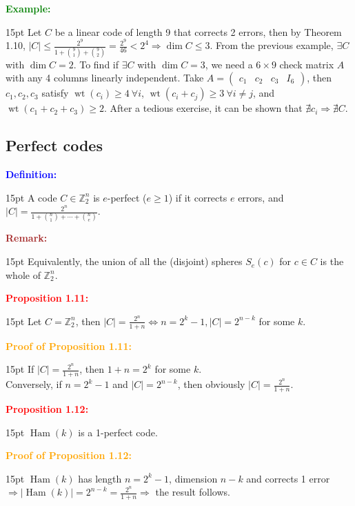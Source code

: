 \documentclass[12pt]{article}
\newcommand{\noparskip}{\vspace{-\parskip}}
\newenvironment{dent}
	{\begin{adjustwidth}{15pt}{}\noparskip}
	{\end{adjustwidth}}
\newenvironment{result}[1]
	{\textcolor{Red}{\textbf{#1:}}\begin{dent}}
	{\end{dent}}
\newenvironment{proof}[1]
	{\textcolor{Orange}{\textbf{Proof of #1:}}\begin{dent}}
	{\end{dent}}
\newenvironment{definition}
	{\textcolor{Blue}{\textbf{Definition:}}\begin{dent}}
	{\end{dent}}
\newenvironment{example}
	{\textcolor{Green}{\textbf{Example:}}\begin{dent}}
	{\end{dent}}
\newenvironment{remark}
	{\textcolor{Brown}{\textbf{Remark:}}\begin{dent}}
	{\end{dent}}
\renewcommand{\implies}{\Rightarrow}
\renewcommand{\iff}{\Leftrightarrow}
\newcommand{\sizeof}[1]{\left| #1 \right|}
\newcommand{\Z}{\mathbb{Z}}
\newcommand{\wt}[1]{\operatorname{wt}(#1)}
\newcommand{\Ham}[1]{\operatorname{Ham}(#1)}
\begin{document}
\begin{example}
Let $C$ be a linear code of length 9 that corrects 2 errors, then by Theorem 1.10, $\sizeof{C} \le \frac{2^9}{1 + \binom{9}{1} + \binom{9}{2}} = \frac{2^9}{46} < 2^4 \implies \dim C \le 3$. From the previous example, $\exists C$ with $\dim C = 2$. To find if $\exists C$ with $\dim C = 3$, we need a $6 \times 9$ check matrix $A$ with any 4 columns linearly independent. Take $A = \begin{pmatrix} c_1 & c_2 & c_3 & I_6 \end{pmatrix}$, then $c_1, c_2, c_3$ satisfy $\wt{c_i} \ge 4\ \forall i$, $\wt{c_i + c_j} \ge 3\ \forall i \ne j$, and $\wt{c_1 + c_2 + c_3} \ge 2$. After a tedious exercise, it can be shown that $\nexists c_i \implies \nexists C$.
\end{example}

\subsection{Perfect codes}

\begin{definition}
A code $C \in \Z_2^n$ is $e$-perfect ($e \ge 1$) if it corrects $e$ errors, and $\sizeof{C} = \frac{2^n}{1 + \binom{n}{1} + \cdots + \binom{n}{e}}$.
\end{definition}

\begin{remark}
Equivalently, the union of all the (disjoint) spheres $S_e(c)$ for $c \in C$ is the whole of $\Z_2^n$.
\end{remark}

\begin{result}{Proposition 1.11}
Let $C = \Z_2^n$, then $\sizeof{C} = \frac{2^n}{1 + n} \iff n = 2^k - 1, \sizeof{C} = 2^{n - k}$ for some $k$.
\end{result}

\begin{proof}{Proposition 1.11}
If $\sizeof{C} = \frac{2^n}{1 + n}$, then $1 + n = 2^k$ for some $k$. \\
Conversely, if $n = 2^k - 1$ and $\sizeof{C} = 2^{n - k}$, then obviously $\sizeof{C} = \frac{2^n}{1 + n}$.
\end{proof}

\begin{result}{Proposition 1.12}
$\Ham{k}$ is a 1-perfect code.
\end{result}

\begin{proof}{Proposition 1.12}
$\Ham{k}$ has length $n = 2^k - 1$, dimension $n - k$ and corrects 1 error $\implies \sizeof{\Ham{k}} = 2^{n - k} = \frac{2^n}{1 + n} \implies$ the result follows.
\end{proof}
\end{document}
